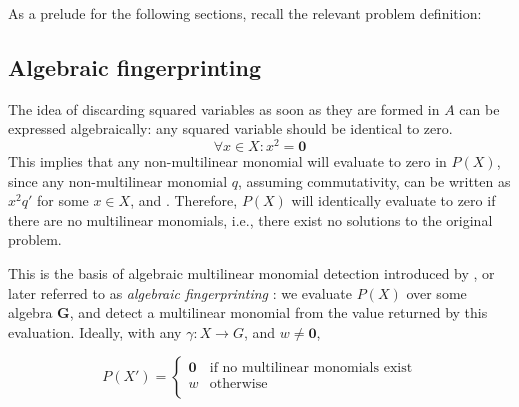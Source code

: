 As a prelude for the following sections, recall the relevant problem definition: 
\begin{problem}
\end{problem}

\subsection{Algebraic fingerprinting}
\label{sect:algebraic_fingerprinting}

The idea of discarding squared variables as soon as they are formed in $A$ 
can be expressed algebraically: any squared variable should be identical to
zero. 
\begin{equation}
  \label{eq:squared_to_zero}
\forall x \in X: x^2 = \mathbf{0}
\end{equation}
This implies that any non-multilinear monomial will evaluate to zero in $P(X)$, since 
any non-multilinear monomial $q$, assuming commutativity, can be written as $x^2q'$ 
for some $x \in X$, and . 
Therefore, $P(X)$ will identically evaluate to zero if there are no multilinear monomials, 
i.e., there exist no solutions to the original problem.

This is the basis of algebraic multilinear monomial detection introduced by 
\citeauthor{Koutis08} \cite{Koutis08}, or later referred to as \emph{algebraic fingerprinting} \cite{KouWil15}: 
we evaluate $P(X)$ over some algebra $\mathbf{G}$, and detect a multilinear monomial from 
the value returned by this evaluation. Ideally, with any $\gamma \colon X \to
G$,
and $w \neq \mathbf{0}$, 

\begin{equation}
  \label{eq:polynomial_identity}
  P(X') =
    \begin{cases}
      \mathbf{0} & \text{if no multilinear monomials exist}\\
      w & \text{otherwise}\\
    \end{cases}       
\end{equation}

